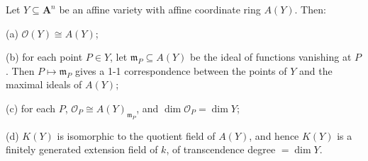 Let $Y \subseteq \mathbf{A}^n$ be an affine variety with affine coordinate ring $A(Y)$. Then:

(a) $\mathcal{O}(Y) \cong A(Y)$;

(b) for each point $P \in Y$, let $\mathfrak{m}_P \subseteq A(Y)$ be the ideal of functions vanishing at $P$. Then $P \mapsto \mathfrak{m}_P$ gives a 1-1 correspondence between the points of $Y$ and the maximal ideals of $A(Y)$;

(c) for each $P$, $\mathcal{O}_P \cong A(Y)_{\mathfrak{m}_P}$, and $\dim \mathcal{O}_P = \dim Y$;

(d) $K(Y)$ is isomorphic to the quotient field of $A(Y)$, and hence $K(Y)$ is a finitely generated extension field of $k$, of transcendence degree $= \dim Y$.
